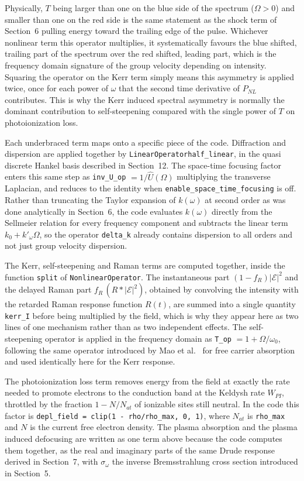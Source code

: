 Physically, $T$ being larger than one on the blue side of the spectrum ($\Omega>0$) and smaller than one on the red side is the same statement as the shock term of Section~6 pulling energy toward the trailing edge of the pulse. Whichever nonlinear term this operator multiplies, it systematically favours the blue shifted, trailing part of the spectrum over the red shifted, leading part, which is the frequency domain signature of the group velocity depending on intensity. Squaring the operator on the Kerr term simply means this asymmetry is applied twice, once for each power of $\omega$ that the second time derivative of $P_{NL}$ contributes. This is why the Kerr induced spectral asymmetry is normally the dominant contribution to self-steepening compared with the single power of $T$ on photoionization loss.

Each underbraced term maps onto a specific piece of the code. Diffraction and dispersion are applied together by \texttt{LinearOperator\dotb half\_linear}, in the quasi discrete Hankel basis described in Section~12. The space-time focusing factor enters this same step as \texttt{inv\_U\_op} $=1/\hat{U}(\Omega)$ multiplying the transverse Laplacian, and reduces to the identity when \texttt{enable\_space\_time\_focusing} is off. Rather than truncating the Taylor expansion of $k(\omega)$ at second order as was done analytically in Section~6, the code evaluates $k(\omega)$ directly from the Sellmeier relation for every frequency component and subtracts the linear term $k_0+k'_\omega\Omega$, so the operator \texttt{delta\_k} already contains dispersion to all orders and not just group velocity dispersion.

The Kerr, self-steepening and Raman terms are computed together, inside the function \texttt{split} of \texttt{NonlinearOperator}. The instantaneous part $(1-f_R)|\mathcal{E}|^2$ and the delayed Raman part $f_R\,(R * |\mathcal{E}|^2)$, obtained by convolving the intensity with the retarded Raman response function $R(t)$, are summed into a single quantity \texttt{kerr\_I} before being multiplied by the field, which is why they appear here as two lines of one mechanism rather than as two independent effects. The self-steepening operator is applied in the frequency domain as \texttt{T\_op} $= 1+\Omega/\omega_0$, following the same operator introduced by Mao et al.~\cite{mao2004} for free carrier absorption and used identically here for the Kerr response.

The photoionization loss term removes energy from the field at exactly the rate needed to promote electrons to the conduction band at the Keldysh rate $W_{PI}$, throttled by the fraction $1-N/N_{at}$ of ionizable sites still neutral. In the code this factor is \texttt{depl\_field = clip(1 - rho/rho\_max, 0, 1)}, where $N_{at}$ is \texttt{rho\_max} and $N$ is the current free electron density. The plasma absorption and the plasma induced defocusing are written as one term above because the code computes them together, as the real and imaginary parts of the same Drude response derived in Section~7, with $\sigma_\omega$ the inverse Bremsstrahlung cross section introduced in Section~5.


